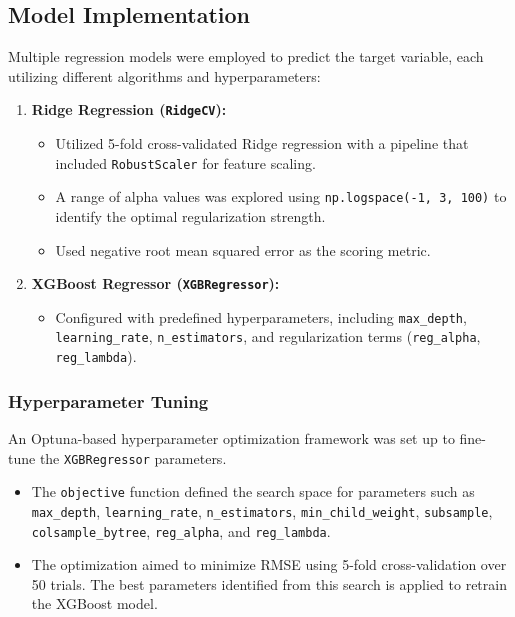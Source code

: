 \documentclass[11pt,a4paper]{article}
\begin{document}
\subsection{Model Implementation}
Multiple regression models were employed to predict the target variable, each
utilizing different algorithms and hyperparameters:

\begin{enumerate}

  \item \textbf{Ridge Regression (\texttt{RidgeCV}):}
        \begin{itemize}
          \item Utilized 5-fold cross-validated Ridge regression with a pipeline that included
                \texttt{RobustScaler} for feature scaling.
          \item A range of alpha values was explored using \texttt{np.logspace(-1, 3, 100)} to
                identify the optimal regularization strength.
          \item Used negative root mean squared error as the scoring metric.
        \end{itemize}

  \item \textbf{XGBoost Regressor (\texttt{XGBRegressor}):}
        \begin{itemize}
          \item Configured with predefined hyperparameters, including \texttt{max\_depth},
                \texttt{learning\_rate}, \texttt{n\_estimators}, and regularization terms
                (\texttt{reg\_alpha}, \texttt{reg\_lambda}).
        \end{itemize}
\end{enumerate}

\subsubsection{Hyperparameter Tuning}
An Optuna-based hyperparameter optimization framework was set up to fine-tune
the \texttt{XGBRegressor} parameters.

\begin{itemize}
  \item The \texttt{objective} function defined the search space for parameters such as
        \texttt{max\_depth}, \texttt{learning\_rate}, \texttt{n\_estimators},
        \texttt{min\_child\_weight}, \texttt{subsample}, \texttt{colsample\_bytree},
        \texttt{reg\_alpha}, and \texttt{reg\_lambda}.
  \item The optimization aimed to minimize RMSE using 5-fold cross-validation over 50
        trials. The best parameters identified from this search is applied to retrain
        the XGBoost model.
\end{itemize}
\end{document}
